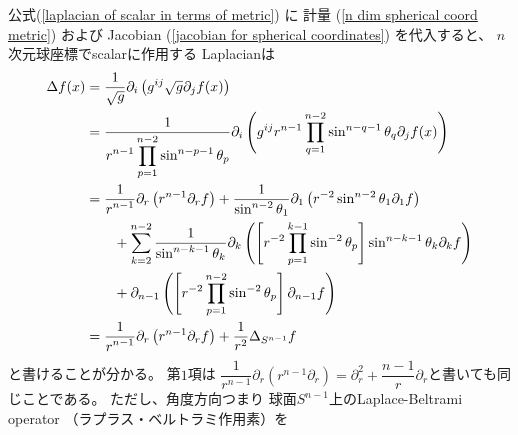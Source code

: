 公式(\ref{laplacian of scalar in terms of metric})
に
計量
(\ref{n dim spherical coord metric})
および
Jacobian
(\ref{jacobian for spherical coordinates})
を代入すると、
$n$次元球座標でscalarに作用する
Laplacianは
\begin{align}
    \Delta f(x)
&=
    \dfrac{1}{ \sqrt {g} }
    \partial_i
    \left(
        g^{ij}
        \sqrt{ g }
        \partial_j
        f (x)
    \right)
\notag\\&
=
    \dfrac{1}{
    \displaystyle
        r^{n-1}
        \prod_{p = 1}^{n-2}
        \sin^{n - p - 1} \theta_p
    }
    \partial_i
    \left(
        g^{ij}
        r^{n-1}
        \prod_{q = 1}^{n-2}
        \sin^{n - q - 1} \theta_q
        \partial_j
        f (x)
    \right)
\notag\\&
=
    \dfrac{1}{
    \displaystyle
        r^{n-1}
    }
    \partial_r
    \left(
        r^{n-1}
        \partial_r
        f
    \right)
+
    \dfrac{1}{
    \displaystyle
        \sin^{n - 2} \theta_1
    }
    \partial_1
    \left(
        r^{-2}
        \sin^{n - 2} \theta_1
        \partial_1
        f
    \right)
\notag\\&\qquad
+
\sum_{k = 2}^{n-2}
    \dfrac{1}{
    \displaystyle
        \sin^{n - k - 1} \theta_k
    }
    \partial_k
    \left(
    \left[
        r^{-2}
        \prod_{p=1}^{k-1}
        \sin^{-2} \theta_p
    \right]
        \sin^{n - k - 1} \theta_k
        \partial_k
        f
    \right)
\notag\\&\qquad
+
    \partial_{n-1}
    \left(
        \left[
            r^{-2}
            \prod_{p=1}^{n-2}
            \sin^{-2} \theta_p
        \right]
        \partial_{n-1}
        f
    \right)
\notag\\&
=
    \dfrac{1}{
    \displaystyle
        r^{n-1}
    }
    \partial_r
    \left(
        r^{n-1}
        \partial_r
        f
    \right)
+
    \dfrac{1}{r^2}
        \Delta_{S^{n-1}}
        f
\label{n dim laplacian in polar coordinates}
\end{align}
と書けることが分かる。
第$1$項は
$    \dfrac{1}{
    \displaystyle
        r^{n-1}
    }
    \partial_r
    \left(
        r^{n-1}
        \partial_r
    \right)
=
    \partial_r^2
    +
    \dfrac{n-1}{ r }
        \partial_r
$と書いても同じことである。
ただし、角度方向つまり
球面$S^{n-1}$上のLaplace-Beltrami operator
（ラプラス・ベルトラミ作用素）を
